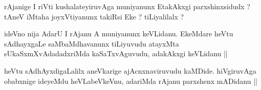 
\begin{artha}
rAjanige I riVti kushalateyiruvAga muniyanunx EtakAkxgi parxshinxsidudx ? tAneV iMtaha joyxVtiyanunx takiRsi Eke ? tiLiyalilalx ?
\end{artha}


\begin{artha}
ideVno nija AdarU I rAjanu A muniyanunx keVLidanu. EkeMdare heVtu sAdhayxgaLe saMbaMdhavanunx tiLiyuvudu atayxMta sUkaSxmXvAdadadxriMda kaSaTxvAguvudu, adakAkxgi keVLidanu ||
\end{artha}

\begin{artha}
heVtu sAdhAyxdigaLalilx aneVkarige ajAcnxnaviruvudu kaMDide. hiVgiruvAga obabxnige ideyeMdu heVLabeVkeVnu, adariMda rAjanu parxshenx mADidanu ||
\end{artha}


